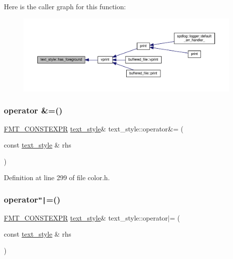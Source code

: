 Here is the caller graph for this function\+:
\nopagebreak
\begin{figure}[H]
\begin{center}
\leavevmode
\includegraphics[width=350pt]{classtext__style_ad605ce62796a99d87f0e9744617cf402_icgraph}
\end{center}
\end{figure}
\mbox{\label{classtext__style_a347bf58ff73936da8f35bbb4f595975b}} 
\subsubsection{\texorpdfstring{operator \&=()}{operator \&=()}}
{\footnotesize\ttfamily \hyperlink{core_8h_a69201cb276383873487bf68b4ef8b4cd}{F\+M\+T\+\_\+\+C\+O\+N\+S\+T\+E\+X\+PR} \hyperlink{classtext__style}{text\+\_\+style}\& text\+\_\+style\+::operator\&= (\begin{DoxyParamCaption}\item[{const \hyperlink{classtext__style}{text\+\_\+style} \&}]{rhs }\end{DoxyParamCaption})\hspace{0.3cm}{\ttfamily [inline]}}



Definition at line 299 of file color.\+h.

\mbox{\label{classtext__style_aaa488412bf58f9a9760b421dea9aeaa9}} 
\subsubsection{\texorpdfstring{operator\texttt{"|}=()}{operator|=()}}
{\footnotesize\ttfamily \hyperlink{core_8h_a69201cb276383873487bf68b4ef8b4cd}{F\+M\+T\+\_\+\+C\+O\+N\+S\+T\+E\+X\+PR} \hyperlink{classtext__style}{text\+\_\+style}\& text\+\_\+style\+::operator$\vert$= (\begin{DoxyParamCaption}\item[{const \hyperlink{classtext__style}{text\+\_\+style} \&}]{rhs }\end{DoxyParamCaption})\hspace{0.3cm}{\ttfamily [inline]}}



